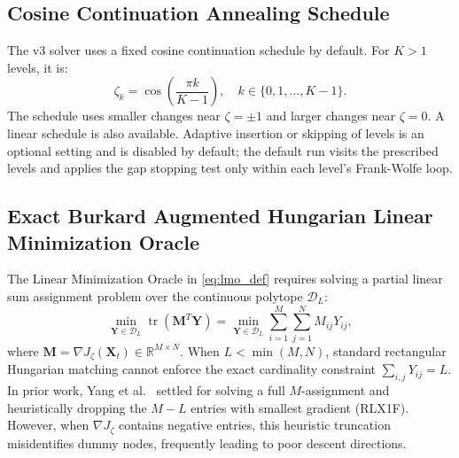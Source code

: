 \documentclass[conference]{IEEEtran}
\begin{document}
\subsection{Cosine Continuation Annealing Schedule}

The v3 solver uses a fixed cosine continuation schedule by default. For $K>1$ levels, it is:
\begin{equation}
\zeta_k = \cos\!\left(\frac{\pi k}{K - 1}\right), \quad k \in \{0, 1, \ldots, K - 1\}.
\label{eq:cosine_schedule}
\end{equation}
The schedule uses smaller changes near $\zeta=\pm1$ and larger changes near $\zeta=0$. A linear schedule is also available. Adaptive insertion or skipping of levels is an optional setting and is disabled by default; the default run visits the prescribed levels and applies the gap stopping test only within each level's Frank-Wolfe loop.

\subsection{Exact Burkard Augmented Hungarian Linear Minimization Oracle}
\label{subsec:burkard}

The Linear Minimization Oracle in \eqref{eq:lmo_def} requires solving a partial linear sum assignment problem over the continuous polytope $\mathcal{D}_L$:
\begin{equation}
\min_{\mathbf{Y} \in \mathcal{D}_L} \operatorname{tr}(\mathbf{M}^T \mathbf{Y}) = \min_{\mathbf{Y} \in \mathcal{D}_L} \sum_{i=1}^M \sum_{j=1}^N M_{ij} Y_{ij},
\label{eq:lmo_problem}
\end{equation}
where $\mathbf{M} = \nabla J_\zeta(\mathbf{X}_t) \in \mathbb{R}^{M \times N}$. When $L < \min(M, N)$, standard rectangular Hungarian matching cannot enforce the exact cardinality constraint $\sum_{i, j} Y_{ij} = L$. In prior work, Yang et al.~\cite{yang2018algorithm} settled for solving a full $M$-assignment and heuristically dropping the $M - L$ entries with smallest gradient (RLX1F). However, when $\nabla J_\zeta$ contains negative entries, this heuristic truncation misidentifies dummy nodes, frequently leading to poor descent directions.
\end{document}
